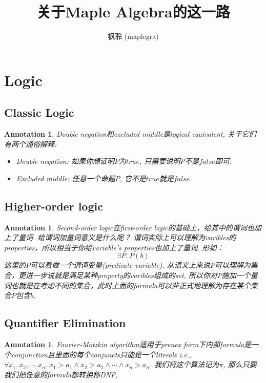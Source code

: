\documentclass{article}
\newtheorem{annotation}[theorem]{Annotation}
\begin{document}
\title{关于Maple Algebra的这一路}
\author{枫聆 (maplegra)}
\maketitle
\tableofcontents
\newpage

\section{Logic}

\subsection{Classic Logic}

\begin{annotation}
\rm Double negation和excluded middle是logical equivalent, 关于它们有两个通俗解释:
\begin{itemize}
	\item Double negation: 如果你想证明$P$为$true$, 只需要说明$P$不是$false$即可.
	\item Excluded middle: 任意一个命题$P$, 它不是$true$就是$false$.
\end{itemize}
\end{annotation}

\subsection{Higher-order logic}

\begin{annotation}
\rm Second-order logic在first-order logic的基础上，给其中的谓词也加上了量词. 给谓词加量词意义是什么呢？ 谓词实际上可以理解为varibles的properties，所以相当于你给variable's properties也加上了量词. 形如：
\[
	\exists P.\ P(b)
\]
这里的$P$可以看做一个谓词变量(predicate variable). 从语义上来说$P$可以理解为集合，更进一步说就是满足某种property的varibles组成的set, 所以你对$P$施加一个量词也就是在考虑不同的集合，此时上面的formula可以非正式地理解为存在某个集合$P$包含$b$.
\end{annotation}

\subsection{Quantifier Elimination}

\begin{annotation}
\rm Fourier-Motzkin algorithm适用于prenex form下内部formula是一个conjunction且里面的每个conjuncts只能是一个literals i.e., $\forall {x_1,x_2,\cdots,x_n}.~ x_1 > a_1 \wedge x_2 > a_2 \wedge \cdots \wedge x_n > a_n$. 我们将这个算法记为$\pi$, 那么只要我们把任意的formula都转换称DNF,
\end{annotation}
\end{document}
